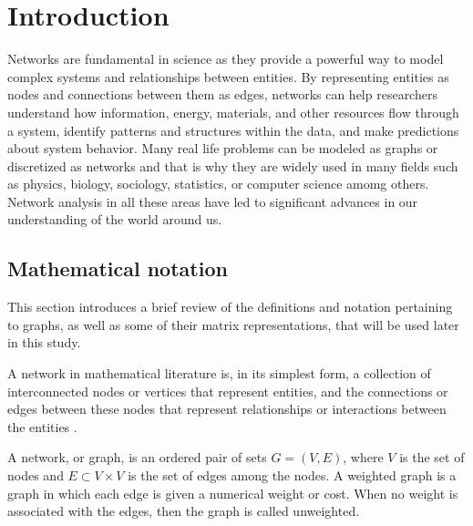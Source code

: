 
\chapter[Introduction]{Introduction}
\label{chap:intro}

Networks are fundamental in  science as they provide a powerful way to model complex systems and relationships between entities. By representing entities as nodes and connections between them as edges, networks can help researchers understand how information, energy, materials, and other resources flow through a system, identify patterns and structures within the data, and make predictions about system behavior. Many real life problems can be modeled as graphs or discretized as networks and that is why they are widely used in many fields such as physics, biology, sociology, statistics, or computer science amomg others. Network analysis in all these areas have led to significant advances in our understanding of the world around us. 

\section{Mathematical notation}
\label{sec:graph}
This section introduces a brief review of the definitions and notation pertaining to graphs, as well as some of their matrix representations, that will be used later in this study.

A network in  mathematical literature is, in its simplest form, a collection of interconnected nodes or vertices that represent entities, and the connections or edges between these nodes that represent relationships or interactions between the entities \cite{arrigo2022dynamic}.

\begin{definition}
    A network, or graph, is an ordered pair of sets $G = (V, E)$, where $V$ is the set of nodes and $E\subset V\times V$ is the set of edges among the nodes. A weighted graph is a graph in which each edge is given a numerical weight or cost. When no weight is associated with the edges, then the graph is called unweighted.
\end{definition}

